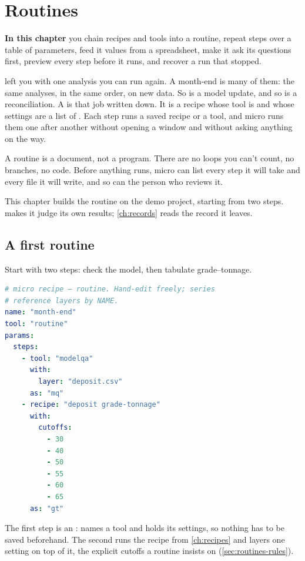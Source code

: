 \chapter{Routines}\label{ch:routines}
\begin{goals}
\textbf{In this chapter} you chain recipes and tools into a routine, repeat steps over a table of parameters, feed it values from a spreadsheet, make it ask its questions first, preview every step before it runs, and recover a run that stopped.
\end{goals}

 left you with one analysis you can run again. A month-end is many of them: the same analyses, in the same order, on new data. So is a model update, and so is a reconciliation. A  is that job written down. It is a recipe whose tool is  and whose settings are a list of . Each step runs a saved recipe or a tool, and micro runs them one after another without opening a window and without asking anything on the way.

A routine is a document, not a program. There are no loops you can't count, no branches, no code. Before anything runs, micro can list every step it will take and every file it will write, and so can the person who reviews it.

This chapter builds the routine  on the demo project, starting from two steps.  makes it judge its own results; \cref{ch:records} reads the record it leaves.

\section{A first routine}\label{sec:routines-first}
Start with two steps: check the model, then tabulate grade–tonnage.

\begin{lstlisting}[language=yaml]
# micro recipe — routine. Hand-edit freely; series
# reference layers by NAME.
name: "month-end"
tool: "routine"
params:
  steps:
    - tool: "modelqa"
      with:
        layer: "deposit.csv"
      as: "mq"
    - recipe: "deposit grade-tonnage"
      with:
        cutoffs:
          - 30
          - 40
          - 50
          - 55
          - 60
          - 65
      as: "gt"
\end{lstlisting}

The first step is an :  names a tool and  holds its settings, so nothing has to be saved beforehand. The second runs the recipe from \cref{ch:recipes} and layers one setting on top of it, the explicit cutoffs a routine insists on (\cref{sec:routines-rules}).

